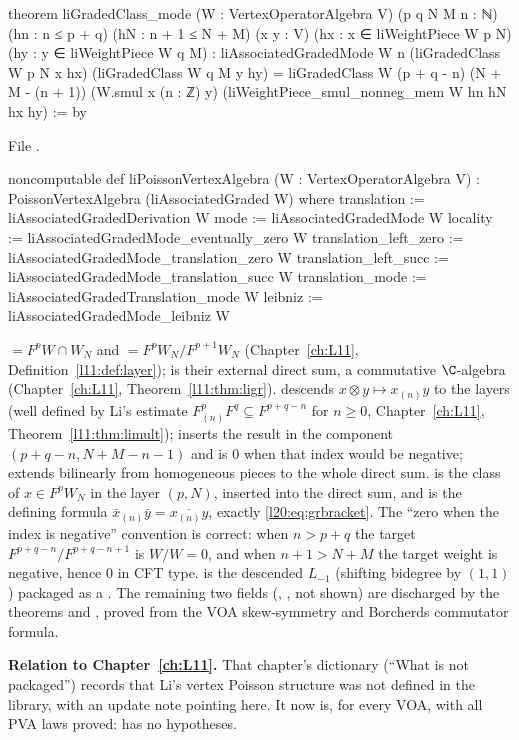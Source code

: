 \begin{leancode}
theorem liGradedClass_mode (W : VertexOperatorAlgebra V) (p q N M n : ℕ)
    (hn : n ≤ p + q) (hN : n + 1 ≤ N + M)
    (x y : V) (hx : x ∈ liWeightPiece W p N) (hy : y ∈ liWeightPiece W q M) :
    liAssociatedGradedMode W n (liGradedClass W p N x hx) (liGradedClass W q M y hy) =
      liGradedClass W (p + q - n) (N + M - (n + 1)) (W.smul x (n : ℤ) y)
        (liWeightPiece_smul_nonneg_mem W hn hN hx hy) := by
\end{leancode}
\noindent File .
\begin{leancode}
noncomputable def liPoissonVertexAlgebra (W : VertexOperatorAlgebra V) :
    PoissonVertexAlgebra (liAssociatedGraded W) where
  translation := liAssociatedGradedDerivation W
  mode := liAssociatedGradedMode W
  locality := liAssociatedGradedMode_eventually_zero W
  translation_left_zero := liAssociatedGradedMode_translation_zero W
  translation_left_succ := liAssociatedGradedMode_translation_succ W
  translation_mode := liAssociatedGradedTranslation_mode W
  leibniz := liAssociatedGradedMode_leibniz W
\end{leancode}

\begin{dictionary}
 $=F^pW\cap W_N$ and  $=F^pW_N/F^{p+1}W_N$
(Chapter~\ref{ch:L11}, Definition~\ref{l11:def:layer});  is their external
direct sum, a commutative $\C$-algebra (Chapter~\ref{ch:L11}, Theorem~\ref{l11:thm:ligr}).
 descends $x\otimes y\mapsto x_{(n)}y$ to the layers (well defined by Li's estimate
$F^p_{(n)}F^q\subseteq F^{p+q-n}$ for $n\ge0$, Chapter~\ref{ch:L11}, Theorem~\ref{l11:thm:limult});
 inserts the result in the component $(p+q-n,N+M-n-1)$ and is $0$ when that
index would be negative;  extends bilinearly from homogeneous pieces to the whole
direct sum.  is the class of $x\in F^pW_N$ in the layer $(p,N)$, inserted into
the direct sum, and  is the defining formula
$\bar x_{(n)}\bar y=\overline{x_{(n)}y}$, exactly \eqref{l20:eq:grbracket}. The ``zero when the index is
negative'' convention is correct: when $n>p+q$ the target $F^{p+q-n}/F^{p+q-n+1}$ is $W/W=0$, and when
$n+1>N+M$ the target weight is negative, hence $0$ in CFT type.  is the
descended $L_{-1}$ (shifting bidegree by $(1,1)$) packaged as a . The remaining two fields
(, , not shown) are discharged by the theorems 
and , proved from the VOA skew-symmetry and Borcherds commutator formula.

\textbf{Relation to Chapter~\ref{ch:L11}.} That chapter's dictionary (``What is not packaged'') records that Li's
vertex Poisson structure was not defined in the library, with an update note pointing here. It now is, for every VOA,
with all PVA laws proved:  has no hypotheses.
\end{dictionary}

